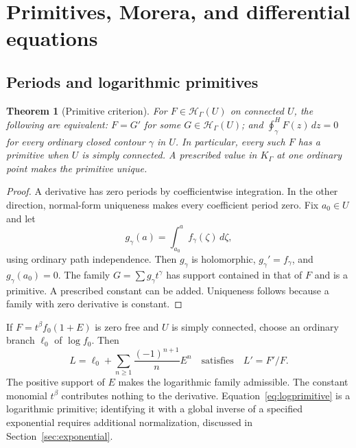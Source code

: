 \documentclass[11pt,a4paper]{article}
\newtheorem{theorem}{Theorem}[section]
\theoremstyle{definition}
\theoremstyle{remark}
\newcommand{\HH}{\mathcal H}
\newcommand{\Hoint}{\mathop{\oint}\nolimits^{\!H}}
\begin{document}
\section{Primitives, Morera, and differential equations}\label{sec:primitive}
\subsection{Periods and logarithmic primitives}
\begin{theorem}[Primitive criterion]\label{thm:primitive}
For $F\in\HH_\Gamma(U)$ on connected $U$, the following are
equivalent: $F=G'$ for some $G\in\HH_\Gamma(U)$; and
$\Hoint_\gamma F(z)\,dz=0$ for every ordinary closed contour
$\gamma$ in $U$. In particular, every such $F$ has a primitive
when $U$ is simply connected. A prescribed value in $K_\Gamma$ at one ordinary
point makes the primitive unique.
\end{theorem}
\begin{proof}
A derivative has zero periods by coefficientwise integration. In the
other direction, normal-form uniqueness makes every coefficient
period zero. Fix $a_0\in U$ and let
\[
 g_\gamma(a)=\int_{a_0}^a f_\gamma(\zeta)\,d\zeta,
\]
using ordinary path independence. Then $g_\gamma$ is holomorphic,
$g_\gamma'=f_\gamma$, and $g_\gamma(a_0)=0$. The family
$G=\sum g_\gamma t^\gamma$ has support contained in that of $F$
and is a primitive. A prescribed constant can be added. Uniqueness
follows because a family with zero derivative is constant.
\end{proof}

If $F=t^\beta f_0(1+E)$ is zero free and $U$ is simply connected,
choose an ordinary branch $\ell_0$ of $\log f_0$. Then
\begin{equation}\label{eq:logprimitive}
 L=\ell_0+\sum_{n\ge1}\frac{(-1)^{n+1}}n E^n
 \quad\text{satisfies}\quad L'=F'/F.
\end{equation}
The positive support of $E$ makes the logarithmic family admissible.
The constant monomial $t^\beta$ contributes nothing to the derivative.
Equation~\eqref{eq:logprimitive} is a logarithmic primitive; identifying
it with a global inverse of a specified exponential requires additional
normalization, discussed in Section~\ref{sec:exponential}.
\end{document}
